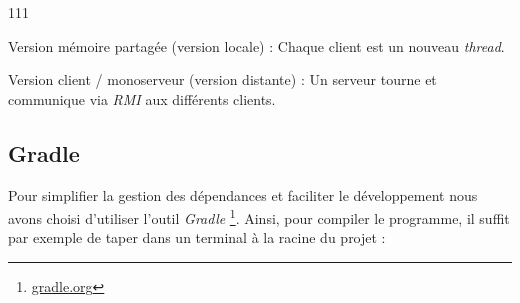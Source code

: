 \begin{dinglist}{111}
    \item Version mémoire partagée (version locale) : Chaque client est un nouveau \textit{thread}.
    \item Version client / monoserveur (version distante) : Un serveur tourne et communique via \textit{RMI} aux différents clients.
\end{dinglist}


\subsection{Gradle}

Pour simplifier la gestion des dépendances et faciliter le développement nous avons choisi d'utiliser
l'outil \textit{Gradle} \footnote{\href{https://gradle.org/}{gradle.org}}.
Ainsi, pour compiler le programme, il suffit par exemple de taper dans un terminal à la racine du projet :

